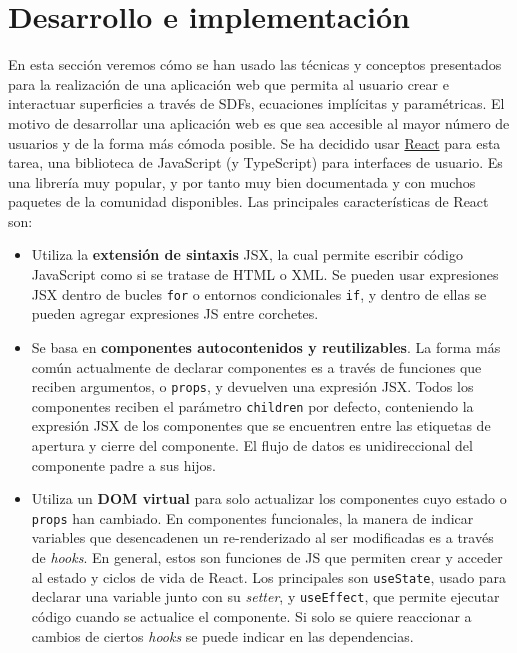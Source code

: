 \chapter{Desarrollo e implementación}
En esta sección veremos cómo se han usado las técnicas y conceptos presentados para la realización de una aplicación web que permita al usuario crear e interactuar superficies a través de SDFs, ecuaciones implícitas y paramétricas. El motivo de desarrollar una aplicación web es que sea accesible al mayor número de usuarios y de la forma más cómoda posible. Se ha decidido usar \href{https://es.reactjs.org/}{React} para esta tarea, una biblioteca de JavaScript (y TypeScript) para interfaces de usuario. Es una librería muy popular, y por tanto muy bien documentada y con muchos paquetes de la comunidad disponibles. Las principales características de React son:
\begin{itemize}
    \item Utiliza la \textbf{extensión de sintaxis} JSX, la cual permite escribir código JavaScript como si se tratase de HTML o XML. Se pueden usar expresiones JSX dentro de bucles \texttt{for} o entornos condicionales \texttt{if}, y dentro de ellas se pueden agregar expresiones JS entre corchetes. 
    \item Se basa en \textbf{componentes autocontenidos y reutilizables}. La forma más común actualmente de declarar componentes es a través de funciones que reciben argumentos, o \texttt{props}, y devuelven una expresión JSX. Todos los componentes reciben el parámetro \texttt{children} por defecto, conteniendo la expresión JSX de los componentes que se encuentren entre las etiquetas de apertura y cierre del componente. El flujo de datos es unidireccional del componente padre a sus hijos.
    \item Utiliza un \textbf{DOM virtual} para solo actualizar los componentes cuyo estado o \texttt{props} han cambiado. En componentes funcionales, la manera de indicar variables que desencadenen un re-renderizado al ser modificadas es a través de \textit{hooks}. En general, estos son funciones de JS que permiten crear y acceder al estado y ciclos de vida de React. Los principales son \texttt{useState}, usado para declarar una variable junto con su \textit{setter}, y \texttt{useEffect}, que permite ejecutar código cuando se actualice el componente. Si solo se quiere reaccionar a cambios de ciertos \textit{hooks} se puede indicar en las dependencias.
\end{itemize}
